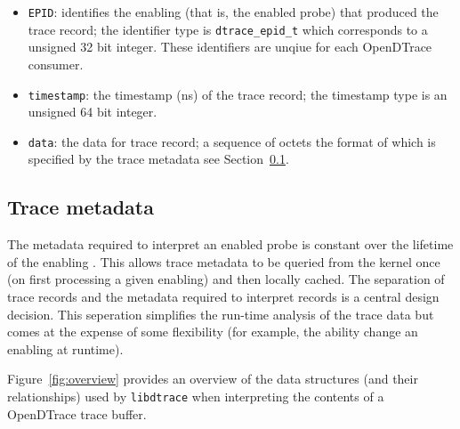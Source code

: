 \begin{itemize}
	\item{\texttt{EPID}}: identifies the enabling (that is, the enabled
		probe) that produced the trace record; the identifier type is
		\texttt{dtrace\_epid\_t} which corresponds to a unsigned 32 bit
		integer.  These identifiers are unqiue for each OpenDTrace
		consumer.

	\item{\texttt{timestamp}:} the timestamp (ns) of the trace record; the
		timestamp type is an unsigned 64 bit integer.

	\item{\texttt{data}:} the data for trace record; a sequence of octets
		the format of which is specified by the trace metadata see
		Section~\ref{subsec:probe_data_structures}.
\end{itemize}

\subsection{Trace metadata}
\label{subsec:probe_data_structures}

The metadata required to interpret an enabled probe is constant over
the lifetime of the enabling \cite{DTrace2004}. This allows trace metadata
to be queried from the kernel once (on first processing a given
enabling) and then locally cached.  The separation of trace records and
the metadata required to interpret records is a central design decision.
This seperation simplifies the run-time analysis of the trace data but comes
at the expense of some flexibility (for example, the ability change an
enabling at runtime).


Figure~\ref{fig:overview} provides an overview of the data structures (and
their relationships) used by \texttt{libdtrace} when interpreting the contents
of a OpenDTrace trace buffer.

